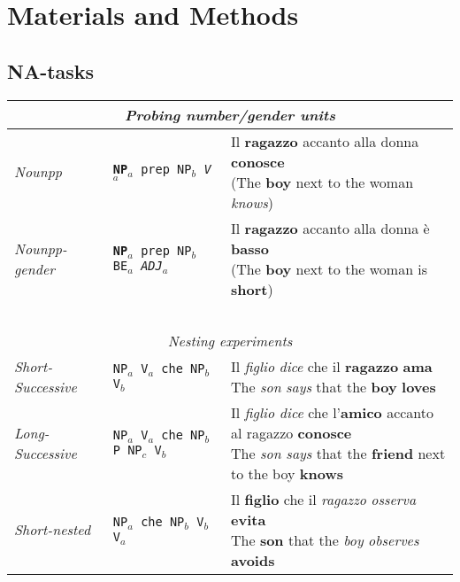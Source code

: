 \section{Materials and Methods}

\subsection{NA-tasks}

\begin{table}
    \setlength\tabcolsep{2mm}
\small
\centering
\begin{tabular}{lll}
\multicolumn{3}{c}{\centering \textit{Probing number/gender units}}\\
\hline
\hline
\emph{Nounpp} & \texttt{\textbf{NP$_a$} prep NP$_b$ \emph{V$_a$}} & \specialcell{Il \textbf{ragazzo} accanto alla donna \textbf{conosce}\vspace{-3mm}\\({\scriptsize The \textbf{boy} next to the woman \emph{knows}})} \\
   \emph{Nounpp-gender} & \texttt{\textbf{NP$_a$} prep NP$_b$ BE$_a$ \emph{ADJ$_a$}} & \specialcell{Il \textbf{ragazzo} accanto alla donna \`{e} \textbf{basso}\vspace{-3mm}\\({\scriptsize The \textbf{boy} next to the woman is \textbf{short}})}\\
~\\
\multicolumn{3}{c}{\centering \textit{Nesting experiments}}\\
\hline
\hline
\emph{Short-Successive} & \texttt{NP$_a$ V$_a$ che NP$_b$ V$_b$} & \specialcell{Il \emph{figlio} \emph{dice} che il \textbf{ragazzo} \textbf{ama}\vspace{-3mm}\\{\scriptsize The \emph{son} \emph{says} that the \textbf{boy} \textbf{loves}}} \\
\emph{Long-Successive} & \texttt{NP$_a$ V$_a$ che NP$_b$ P NP$_c$ V$_b$} & \specialcell{Il \emph{figlio dice} che l'\textbf{amico} accanto al ragazzo \textbf{conosce}\vspace{-3mm}\\{\scriptsize The \emph{son says} that the \textbf{friend} next to the boy \textbf{knows}}} \\
\emph{Short-nested} & \texttt{NP$_a$ che NP$_b$ V$_b$ V$_a$ } & \specialcell{Il \textbf{figlio} che il \emph{ragazzo} \emph{osserva} \textbf{evita}\vspace{-3mm}\\{\scriptsize The \textbf{son} that the \emph{boy} \emph{observes} \textbf{avoids}}} \\

\end{tabular}
\end{table}
